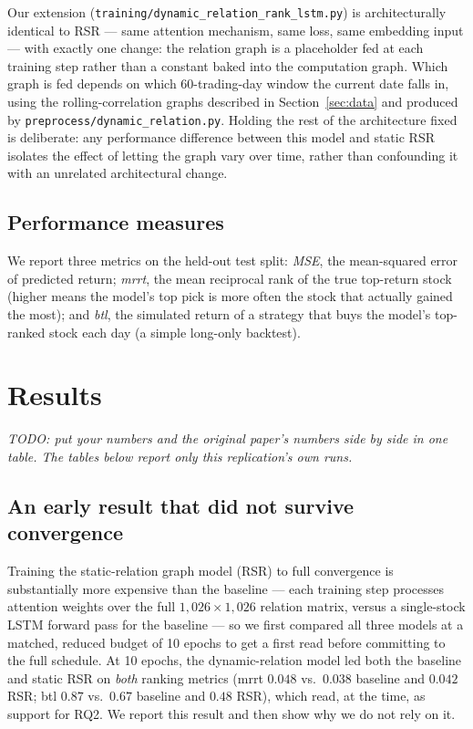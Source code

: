 \documentclass[12pt]{article}
\newcommand{\inst}[1]{\textit{#1}}
\begin{document}
Our extension (\texttt{training/dynamic\_relation\_rank\_lstm.py}) is architecturally identical to
RSR --- same attention mechanism, same loss, same embedding input --- with exactly one change: the
relation graph is a placeholder fed at each training step rather than a constant baked into the
computation graph. Which graph is fed depends on which 60-trading-day window the current date
falls in, using the rolling-correlation graphs described in Section~\ref{sec:data} and produced by
\texttt{preprocess/dynamic\_relation.py}. Holding the rest of the architecture fixed is
deliberate: any performance difference between this model and static RSR isolates the effect of
letting the graph vary over time, rather than confounding it with an unrelated architectural
change.

\subsection{Performance measures}

We report three metrics on the held-out test split: \emph{MSE}, the mean-squared error of
predicted return; \emph{mrrt}, the mean reciprocal rank of the true top-return stock (higher
means the model's top pick is more often the stock that actually gained the most); and
\emph{btl}, the simulated return of a strategy that buys the model's top-ranked stock each day
(a simple long-only backtest).


\section{Results}
\label{sec:results}

\inst{TODO: put your numbers and the original paper's numbers side by side in one table. The
tables below report only this replication's own runs.}

\subsection{An early result that did not survive convergence}

Training the static-relation graph model (RSR) to full convergence is substantially more
expensive than the baseline --- each training step processes attention weights over the full
$1{,}026\times1{,}026$ relation matrix, versus a single-stock LSTM forward pass for the baseline
--- so we first compared all three models at a matched, reduced budget of 10 epochs to get a
first read before committing to the full schedule. At 10 epochs, the dynamic-relation model led
both the baseline and static RSR on \emph{both} ranking metrics (mrrt $0.048$ vs.\ $0.038$
baseline and $0.042$ RSR; btl $0.87$ vs.\ $0.67$ baseline and $0.48$ RSR), which read, at the time,
as support for RQ2. We report this result and then show why we do not rely on it.
\end{document}
